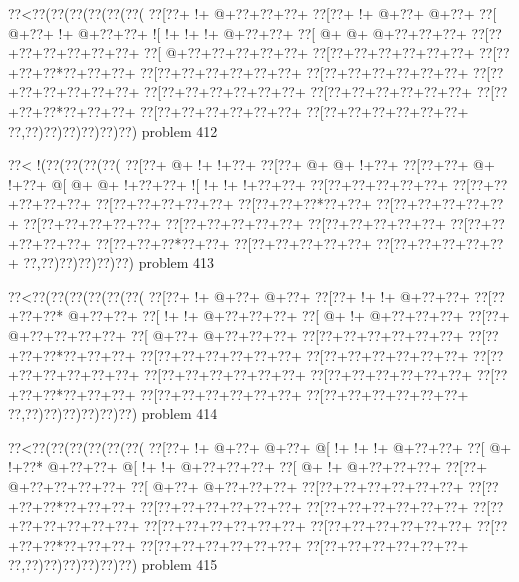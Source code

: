 \vbox{\vbox{\goo
\0??<\0??(\0??(\0??(\0??(\0??(\0??(
\0??[\0??+\- !+\- @+\0??+\0??+\0??+
\0??[\0??+\- !+\- @+\0??+\- @+\0??+
\0??[\- @+\0??+\- !+\- @+\0??+\0??+
\- ![\- !+\- !+\- !+\- @+\0??+\0??+
\0??[\- @+\- @+\- @+\0??+\0??+\0??+
\0??[\0??+\0??+\0??+\0??+\0??+\0??+
\0??[\- @+\0??+\0??+\0??+\0??+\0??+
\0??[\0??+\0??+\0??+\0??+\0??+\0??+
\0??[\0??+\0??+\0??*\0??+\0??+\0??+
\0??[\0??+\0??+\0??+\0??+\0??+\0??+
\0??[\0??+\0??+\0??+\0??+\0??+\0??+
\0??[\0??+\0??+\0??+\0??+\0??+\0??+
\0??[\0??+\0??+\0??+\0??+\0??+\0??+
\0??[\0??+\0??+\0??+\0??+\0??+\0??+
\0??[\0??+\0??+\0??*\0??+\0??+\0??+
\0??[\0??+\0??+\0??+\0??+\0??+\0??+
\0??[\0??+\0??+\0??+\0??+\0??+\0??+
\0??,\0??)\0??)\0??)\0??)\0??)\0??)
}
\hfil problem 412\hfil\break
}

\vbox{\vbox{\goo
\0??<\- !(\0??(\0??(\0??(\0??(
\0??[\0??+\- @+\- !+\- !+\0??+
\0??[\0??+\- @+\- @+\- !+\0??+
\0??[\0??+\0??+\- @+\- !+\0??+
\- @[\- @+\- @+\- !+\0??+\0??+
\- ![\- !+\- !+\- !+\0??+\0??+
\0??[\0??+\0??+\0??+\0??+\0??+
\0??[\0??+\0??+\0??+\0??+\0??+
\0??[\0??+\0??+\0??+\0??+\0??+
\0??[\0??+\0??+\0??*\0??+\0??+
\0??[\0??+\0??+\0??+\0??+\0??+
\0??[\0??+\0??+\0??+\0??+\0??+
\0??[\0??+\0??+\0??+\0??+\0??+
\0??[\0??+\0??+\0??+\0??+\0??+
\0??[\0??+\0??+\0??+\0??+\0??+
\0??[\0??+\0??+\0??*\0??+\0??+
\0??[\0??+\0??+\0??+\0??+\0??+
\0??[\0??+\0??+\0??+\0??+\0??+
\0??,\0??)\0??)\0??)\0??)\0??)
}
\hfil problem 413\hfil\break
}

\vbox{\vbox{\goo
\0??<\0??(\0??(\0??(\0??(\0??(\0??(
\0??[\0??+\- !+\- @+\0??+\- @+\0??+
\0??[\0??+\- !+\- !+\- @+\0??+\0??+
\0??[\0??+\0??+\0??*\- @+\0??+\0??+
\0??[\- !+\- !+\- @+\0??+\0??+\0??+
\0??[\- @+\- !+\- @+\0??+\0??+\0??+
\0??[\0??+\- @+\0??+\0??+\0??+\0??+
\0??[\- @+\0??+\- @+\0??+\0??+\0??+
\0??[\0??+\0??+\0??+\0??+\0??+\0??+
\0??[\0??+\0??+\0??*\0??+\0??+\0??+
\0??[\0??+\0??+\0??+\0??+\0??+\0??+
\0??[\0??+\0??+\0??+\0??+\0??+\0??+
\0??[\0??+\0??+\0??+\0??+\0??+\0??+
\0??[\0??+\0??+\0??+\0??+\0??+\0??+
\0??[\0??+\0??+\0??+\0??+\0??+\0??+
\0??[\0??+\0??+\0??*\0??+\0??+\0??+
\0??[\0??+\0??+\0??+\0??+\0??+\0??+
\0??[\0??+\0??+\0??+\0??+\0??+\0??+
\0??,\0??)\0??)\0??)\0??)\0??)\0??)
}
\hfil problem 414\hfil\break
}

\vbox{\vbox{\goo
\0??<\0??(\0??(\0??(\0??(\0??(\0??(
\0??[\0??+\- !+\- @+\0??+\- @+\0??+
\- @[\- !+\- !+\- !+\- @+\0??+\0??+
\0??[\- @+\- !+\0??*\- @+\0??+\0??+
\- @[\- !+\- !+\- @+\0??+\0??+\0??+
\0??[\- @+\- !+\- @+\0??+\0??+\0??+
\0??[\0??+\- @+\0??+\0??+\0??+\0??+
\0??[\- @+\0??+\- @+\0??+\0??+\0??+
\0??[\0??+\0??+\0??+\0??+\0??+\0??+
\0??[\0??+\0??+\0??*\0??+\0??+\0??+
\0??[\0??+\0??+\0??+\0??+\0??+\0??+
\0??[\0??+\0??+\0??+\0??+\0??+\0??+
\0??[\0??+\0??+\0??+\0??+\0??+\0??+
\0??[\0??+\0??+\0??+\0??+\0??+\0??+
\0??[\0??+\0??+\0??+\0??+\0??+\0??+
\0??[\0??+\0??+\0??*\0??+\0??+\0??+
\0??[\0??+\0??+\0??+\0??+\0??+\0??+
\0??[\0??+\0??+\0??+\0??+\0??+\0??+
\0??,\0??)\0??)\0??)\0??)\0??)\0??)
}
\hfil problem 415\hfil\break
}

